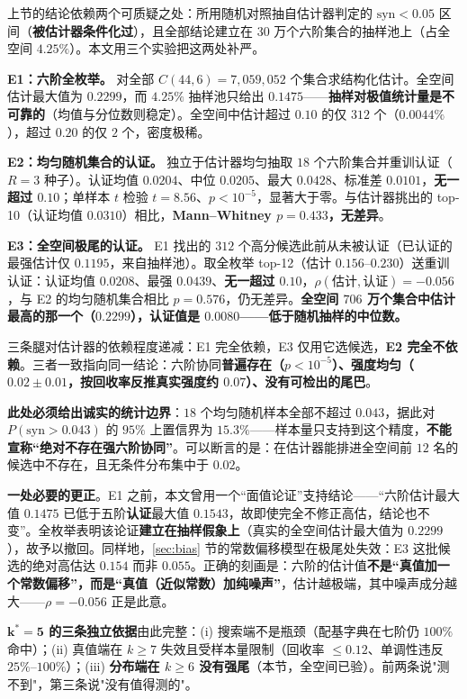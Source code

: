 \documentclass[10.5pt,compsoc,UTF8]{CjC}
\theoremstyle{mystyle}
\begin{document}
上节的结论依赖两个可质疑之处：所用随机对照抽自估计器判定的 $\mathrm{syn}<0.05$ 区间（\textbf{被估计器条件化过}），且全部结论建立在 $30$ 万个六阶集合的抽样池上（占全空间 $4.25\%$）。本文用三个实验把这两处补严。

\textbf{E1：六阶全枚举。} 对全部 $C(44,6)=7{,}059{,}052$ 个集合求结构化估计。全空间估计最大值为 $0.2299$，而 $4.25\%$ 抽样池只给出 $0.1475$——\textbf{抽样对极值统计量是不可靠的}（均值与分位数则稳定）。全空间中估计超过 $0.10$ 的仅 $312$ 个（$0.0044\%$），超过 $0.20$ 的仅 $2$ 个，密度极稀。

\textbf{E2：均匀随机集合的认证。} 独立于估计器均匀抽取 $18$ 个六阶集合并重训认证（$R=3$ 种子）。认证均值 $0.0204$、中位 $0.0205$、最大 $0.0428$、标准差 $0.0101$，\textbf{无一超过 $0.10$}；单样本 $t$ 检验 $t=8.56$、$p<10^{-5}$，显著大于零。与估计器挑出的 top-10（认证均值 $0.0310$）相比，\textbf{Mann--Whitney $p=0.433$，无差异}。

\textbf{E3：全空间极尾的认证。} E1 找出的 $312$ 个高分候选此前从未被认证（已认证的最强估计仅 $0.1195$，来自抽样池）。取全枚举 top-12（估计 $0.156$--$0.230$）送重训认证：认证均值 $0.0208$、最强 $0.0439$、\textbf{无一超过 $0.10$}，$\rho(\text{估计},\text{认证})=-0.056$，与 E2 的均匀随机集合相比 $p=0.576$，仍无差异。\textbf{全空间 $706$ 万个集合中估计最高的那一个（$0.2299$），认证值是 $0.0080$——低于随机抽样的中位数。}

三条腿对估计器的依赖程度递减：E1 完全依赖，E3 仅用它选候选，\textbf{E2 完全不依赖}。三者一致指向同一结论：六阶协同\textbf{普遍存在（$p<10^{-5}$）、强度均匀（$0.02\pm0.01$，按回收率反推真实强度约 $0.07$）、没有可检出的尾巴}。

\textbf{此处必须给出诚实的统计边界}：$18$ 个均匀随机样本全部不超过 $0.043$，据此对 $P(\mathrm{syn}>0.043)$ 的 $95\%$ 上置信界为 $15.3\%$——样本量只支持到这个精度，\textbf{不能宣称“绝对不存在强六阶协同”}。可以断言的是：在估计器能排进全空间前 $12$ 名的候选中不存在，且无条件分布集中于 $0.02$。

\textbf{一处必要的更正}。E1 之前，本文曾用一个“面值论证”支持结论——“六阶估计最大值 $0.1475$ 已低于五阶\textbf{认证}最大值 $0.1543$，故即使完全不修正高估，结论也不变”。全枚举表明该论证\textbf{建立在抽样假象上}（真实的全空间估计最大值为 $0.2299$），故予以撤回。同样地，\ref{sec:bias} 节的常数偏移模型在极尾处失效：E3 这批候选的绝对高估达 $0.154$ 而非 $0.055$。正确的刻画是：六阶的估计值\textbf{不是“真值加一个常数偏移”，而是“真值（近似常数）加纯噪声”}，估计越极端，其中噪声成分越大——$\rho=-0.056$ 正是此意。

\textbf{$\boldsymbol{k^\ast=5}$ 的三条独立依据}由此完整：(i) 搜索端不是瓶颈（配基字典在七阶仍 $100\%$ 命中）；(ii) 真值端在 $k\ge7$ 失效且受样本量限制（回收率 $\le0.12$、单调性违反 $25\%$--$100\%$）；(iii) \textbf{分布端在 $k\ge6$ 没有强尾}（本节，全空间已验）。前两条说"测不到"，第三条说"没有值得测的"。
\end{document}
